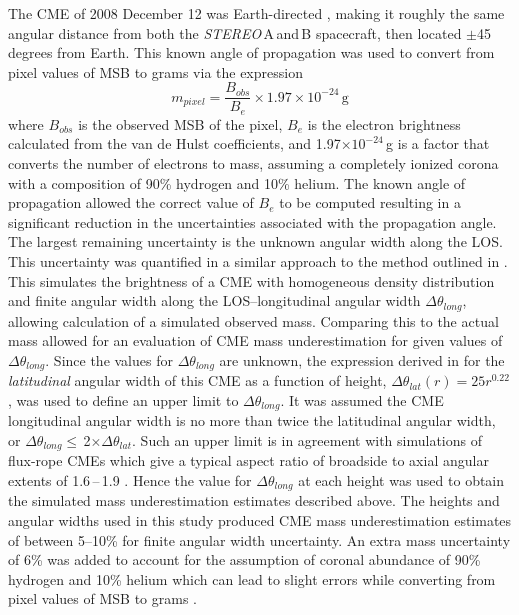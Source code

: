
The CME of 2008 December 12 was Earth-directed \citep{byr10}, making it roughly the same angular distance from both the \emph{STEREO}\,A\,and\,B spacecraft, then located $\pm$45 degrees from Earth. This known angle of propagation was used to convert from pixel values of MSB to grams via the expression
\begin{equation}
m_{pixel}=\frac{B_{obs}}{B_{e}}\times1.97\times10^{-24}\,\mathrm{g}
\end{equation}
where $B_{obs}$ is the observed MSB of the pixel, $B_{e}$ is the electron brightness calculated from the van de Hulst coefficients, and 1.97$ \times10^{-24}$\,g is a factor that converts the number of electrons to mass, assuming a completely ionized corona with a composition of 90\% hydrogen and 10\% helium. The known angle of propagation allowed the correct value of $B_{e}$ to be computed resulting in a significant reduction in the uncertainties associated with the propagation angle. The largest remaining uncertainty is the unknown angular width along the LOS. This uncertainty was quantified in a similar approach to the method outlined in \citet{vou00}. This simulates the brightness of a CME with 
homogeneous density distribution and finite angular width along the LOS--longitudinal angular width $\Delta$$\theta_{long}$, allowing calculation of a simulated observed mass. Comparing this to the actual mass allowed for an evaluation of CME mass underestimation for given values of $\Delta$$\theta_{long}$.  Since the values for $\Delta$$\theta_{long}$ are unknown, the expression derived in \citet{byr10} for the \emph{latitudinal} 
angular width of this CME as a function of height, $\Delta$$\theta_{lat}$$(r)=25r^{0.22}$, was used to define an upper limit to $\Delta$$\theta_{long}$. It was assumed the CME longitudinal angular width is no more than twice the latitudinal angular width, or $\Delta$$\theta_{long}$$\leqslant$\,2$\times$$\Delta$$\theta_{lat}$. Such an upper limit is in agreement with simulations of flux-rope CMEs which give a typical aspect ratio of broadside to axial angular extents of 1.6\,--\,1.9 \citep{krall2006}. Hence the value for $\Delta$$\theta_{long}$ at each height was used to obtain the simulated mass underestimation estimates described above. The heights and angular widths used in this study produced CME mass underestimation estimates of between 5--10\% for finite angular width uncertainty. An extra mass uncertainty of 6\% was added to account for the assumption of coronal abundance of 90\% hydrogen and 10\% helium which can lead to slight errors while converting from pixel values of MSB to grams \citep{vour2010}. 

